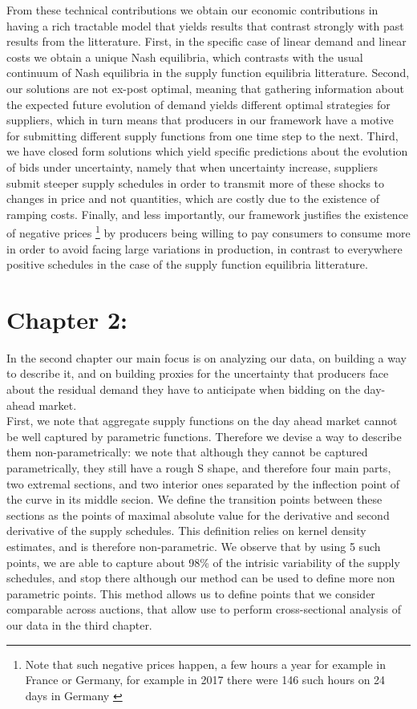 From these technical contributions we obtain our economic contributions in having a rich tractable model that yields results that contrast strongly with past results from the litterature. First, in the specific case of linear demand and linear costs we obtain a unique Nash equilibria, which contrasts with the usual continuum of Nash equilibria in the supply function equilibria litterature. Second, our solutions are not ex-post optimal, meaning that gathering information about the expected future evolution of demand yields different optimal strategies for suppliers, which in turn means that producers in our framework have a motive for submitting different supply functions from one time step to the next. Third, we have closed form solutions which yield specific predictions about the evolution of bids under uncertainty, namely that when uncertainty increase, suppliers submit steeper supply schedules in order to transmit more of these shocks to changes in price and not quantities, which are costly due to the existence of ramping costs. Finally, and less importantly, our framework justifies the existence of negative prices \footnote{Note that such negative prices happen, a few hours a year for example in France or Germany, for example in 2017 there were 146 such hours on 24 days in Germany \cite{epexnegP}} by producers being willing to pay consumers to consume more in order to avoid facing large variations in production, in contrast to everywhere positive schedules in the case of the supply function equilibria litterature.\\

\section*{Chapter 2: }

In the second chapter our main focus is on analyzing our data, on building a way to describe it, and on building proxies for the uncertainty that producers face about the residual demand they have to anticipate when bidding on the day-ahead market. \\

First, we note that aggregate supply functions on the day ahead market cannot be well captured by parametric functions. Therefore we devise a way to describe them non-parametrically: we note that although they cannot be captured parametrically, they still have a rough S shape, and therefore four main parts, two extremal sections, and two interior ones separated by the inflection point of the curve in its middle secion. We define the transition points between these sections as the points of maximal absolute value for the derivative and second derivative of the supply schedules. This definition relies on kernel density estimates, and is therefore non-parametric. We observe that by using 5 such points, we are able to capture about 98\% of the intrisic variability of the supply schedules, and stop there although our method can be used to define more non parametric points. This method allows us to define points that we consider comparable across auctions, that allow use to perform cross-sectional analysis of our data in the third chapter. \\

